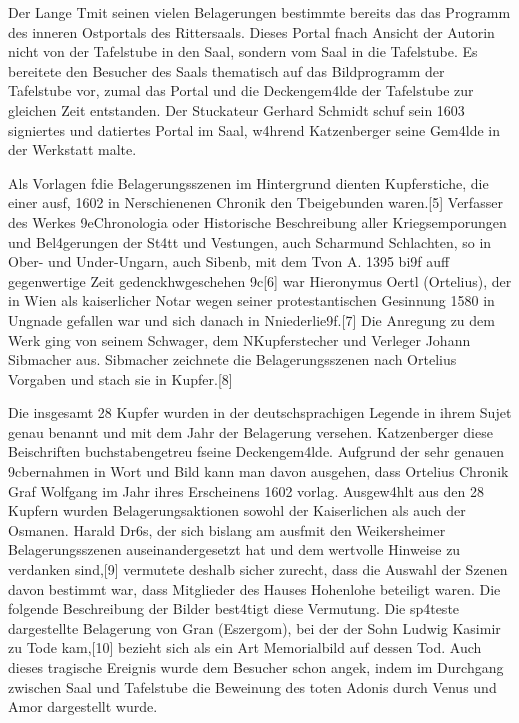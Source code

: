 \documentclass[
  letterpaper,
]{book}
\begin{document}
Der Lange T\xbcrkenkrieg mit seinen vielen Belagerungen bestimmte
bereits das das Programm des inneren Ostportals des Rittersaals. Dieses
Portal f\xbchrte nach Ansicht der Autorin nicht von der Tafelstube
in den Saal, sondern vom Saal in die Tafelstube. Es bereitete den
Besucher des Saals thematisch auf das Bildprogramm der Tafelstube vor,
zumal das Portal und die Deckengem\xa4lde der Tafelstube zur
gleichen Zeit entstanden. Der Stuckateur Gerhard Schmidt schuf sein 1603
signiertes und datiertes Portal im Saal, w\xa4hrend Katzenberger
seine Gem\xa4lde in der Werkstatt malte.

Als Vorlagen f\xbcr die Belagerungsszenen im Hintergrund dienten
Kupferstiche, die einer ausf\xbchrlichen, 1602 in
N\xbcrnberg erschienenen Chronik \xbcber den
T\xbcrkenkrieg beigebunden waren.{[}5{]} Verfasser des Werkes
\x9eChronologia oder Historische Beschreibung aller
Kriegsemporungen und Bel\xa4gerungen der St\xa4tt und Vestungen,
auch Scharm\xbctzeln und Schlachten, so in Ober- und Under-Ungarn,
auch Sibenb\xbcrgen, mit dem T\xbcrcken von A. 1395 bi\x9f
auff gegenwertige Zeit gedenckhw\xbcrdig geschehen
\x9c{[}6{]} war Hieronymus Oertl (Ortelius), der in
Wien als kaiserlicher Notar wegen seiner protestantischen Gesinnung 1580
in Ungnade gefallen war und sich danach in
N\xbcrnberg niederlie\x9f.{[}7{]} Die Anregung zu dem Werk ging
von seinem Schwager, dem N\xbcrnberger Kupferstecher und Verleger
Johann Sibmacher aus. Sibmacher zeichnete die Belagerungsszenen nach
Ortelius Vorgaben und stach sie in Kupfer.{[}8{]}

Die insgesamt 28 Kupfer wurden in der deutschsprachigen Legende in ihrem
Sujet genau benannt und mit dem Jahr der Belagerung versehen.
Katzenberger \xbcbernahm diese Beischriften buchstabengetreu
f\xbcr seine Deckengem\xa4lde. Aufgrund der sehr genauen
\x9cbernahmen in Wort und Bild kann man davon ausgehen, dass
Ortelius Chronik Graf Wolfgang im Jahr ihres Erscheinens
1602 vorlag. Ausgew\xa4hlt aus den 28 Kupfern wurden
Belagerungsaktionen sowohl der Kaiserlichen als auch der Osmanen. Harald
Dr\xb6s, der sich bislang am ausf\xbchrlichsten mit den
Weikersheimer Belagerungsszenen auseinandergesetzt hat und dem wertvolle
Hinweise zu verdanken sind,{[}9{]} vermutete deshalb sicher zurecht,
dass die Auswahl der Szenen davon bestimmt war, dass Mitglieder des
Hauses Hohenlohe beteiligt waren. Die folgende Beschreibung der Bilder
best\xa4tigt diese Vermutung. Die sp\xa4teste dargestellte
Belagerung von Gran (Eszergom), bei der der Sohn Ludwig Kasimir zu Tode
kam,{[}10{]} bezieht sich als ein Art Memorialbild auf dessen Tod. Auch
dieses tragische Ereignis wurde dem Besucher schon angek\xbcndigt,
indem im Durchgang zwischen Saal und Tafelstube die Beweinung des toten
Adonis durch Venus und Amor dargestellt wurde.
\end{document}
